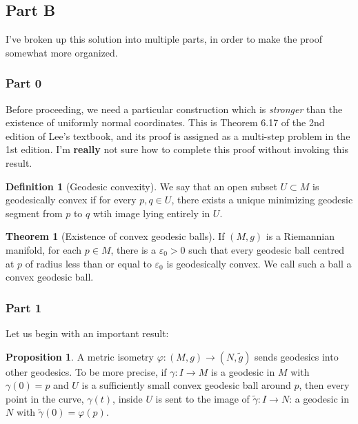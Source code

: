 \documentclass[aps,pra,showpacs,notitlepage,onecolumn,superscriptaddress,nofootinbib]{revtex4-1}
\theoremstyle{definition}
\newtheorem{definition}{Definition}[section]
\newtheorem{theorem}{Theorem}[section]
\newtheorem{prop}{Proposition}[section]
\newcommand{\hhrulefill}{\hspace{-1.5em} \hrulefill}
\begin{document}
\subsection{Part B}

\noindent I've broken up this solution into multiple parts, in order to make the proof somewhat more organized.

\hhrulefill

\subsubsection{Part 0}

\noindent Before proceeding, we need a particular construction which is \emph{stronger} than the existence of uniformly normal coordinates. This is Theorem 6.17 of the 2nd edition of Lee's textbook,
and its proof is assigned as a multi-step problem in the 1st edition. I'm \textbf{really} not sure how to complete this proof without invoking this result.

\begin{definition}[Geodesic convexity]
  We say that an open subset $U \subset M$ is geodesically convex if for every $p, q \in U$, there exists a unique minimizing geodesic segment from $p$ to $q$ wtih image lying entirely in $U$.
\end{definition}

\begin{theorem}[Existence of convex geodesic balls]
  \label{thm:1}
  If $(M, g)$ is a Riemannian manifold, for each $p \in M$, there is a $\varepsilon_0 > 0$ such that every geodesic ball centred at $p$ of radius less than or equal to $\varepsilon_0$ is geodesically convex.
  We call such a ball a convex geodesic ball.
\end{theorem}

\hhrulefill

\subsubsection{Part 1}

\noindent Let us begin with an important result:

\begin{prop}
\label{prop:1}
A metric isometry $\varphi : (M, g) \to (N, \widetilde{g})$ sends geodesics into other geodesics. To be more precise, if $\gamma : I \rightarrow M$ is a geodesic in $M$ with $\gamma(0) = p$
and $U$ is a sufficiently small convex geodesic ball around $p$, then every point in the curve, $\gamma(t)$, inside $U$ is sent to the image of $\widetilde{\gamma} : I \rightarrow N$: a geodesic in
$N$ with $\widetilde{\gamma}(0) = \varphi(p)$.
\end{prop}
\end{document}
